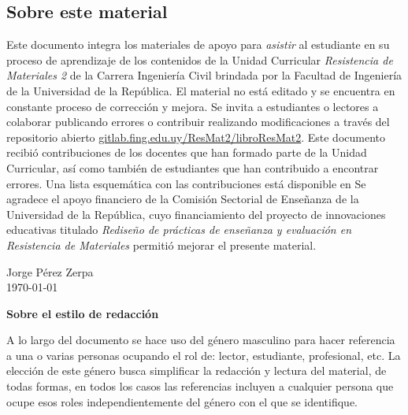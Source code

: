 \subsection*{Sobre este material}

Este documento integra los materiales de apoyo para \textit{asistir} al estudiante en su proceso de aprendizaje de los contenidos de la Unidad Curricular \textit{Resistencia de Materiales 2} de la Carrera Ingeniería Civil brindada por la Facultad de Ingeniería de la Universidad de la República. %
%
El material no está editado y se encuentra en constante proceso de corrección y mejora. Se invita a estudiantes o lectores a colaborar publicando errores o contribuir realizando modificaciones a través del repositorio abierto \href{https://gitlab.fing.edu.uy/ResMat2/libroResMat2}{gitlab.fing.edu.uy/ResMat2/libroResMat2}. %
%
Este documento recibió contribuciones de los docentes que han formado parte de la Unidad Curricular, así como también de estudiantes que han contribuido a encontrar errores. %
Una lista esquemática con las contribuciones está disponible en  %
%
Se agradece el apoyo financiero de la Comisión Sectorial de Enseñanza de la Universidad de la República, cuyo financiamiento del proyecto de innovaciones educativas titulado \textit{Rediseño de prácticas de enseñanza y evaluación en Resistencia de Materiales} permitió mejorar el presente material. %
%
\begin{flushright}
Jorge Pérez Zerpa\\
\today
\end{flushright} 


\vspace{5mm}

\noindent
\textbf{Sobre el estilo de redacción}

A lo largo del documento se hace uso del género masculino para hacer referencia a una o varias personas ocupando el rol de: lector, estudiante, profesional, etc. La elección de este género busca simplificar la redacción y lectura del material, de todas formas, en todos los casos las referencias incluyen a cualquier persona que ocupe esos roles independientemente del género con el que se identifique.

